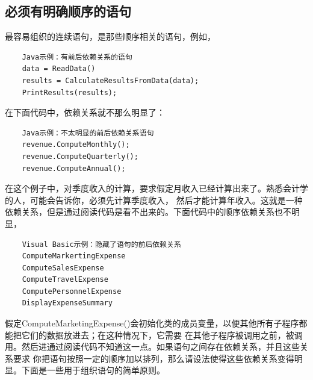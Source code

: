 \documentclass{article}
\begin{document}
\subsection{必须有明确顺序的语句}
最容易组织的连续语句，是那些顺序相关的语句，例如，
\begin{lstlisting}
    Java示例：有前后依赖关系的语句
    data = ReadData()
    results = CalculateResultsFromData(data);
    PrintResults(results);
\end{lstlisting}
在下面代码中，依赖关系就不那么明显了：
\begin{lstlisting}
    Java示例：不太明显的前后依赖关系语句
    revenue.ComputeMonthly();
    revenue.ComputeQuarterly();
    revenue.ComputeAnnual();
\end{lstlisting}
在这个例子中，对季度收入的计算，要求假定月收入已经计算出来了。熟悉会计学的人，可能会告诉你，必须先计算季度收入，
然后才能计算年收入。这就是一种依赖关系，但是通过阅读代码是看不出来的。下面代码中的顺序依赖关系也不明显，
\begin{lstlisting}
    Visual Basic示例：隐藏了语句的前后依赖关系
    ComputeMarkertingExpense
    ComputeSalesExpense
    ComputeTravelExpense
    ComputePersonnelExpense
    DisplayExpenseSummary
\end{lstlisting}
假定ComputeMarketingExpense()会初始化类的成员变量，以便其他所有子程序都能把它们的数据放进去；在这种情况下，它需要
在其他子程序被调用之前，被调用。然后进通过阅读代码不知道这一点。如果语句之间存在依赖关系，并且这些关系要求
你把语句按照一定的顺序加以排列，那么请设法使得这些依赖关系变得明显。下面是一些用于组织语句的简单原则。
\end{document}
